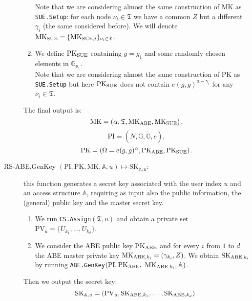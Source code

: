 \documentclass[a4paper,10pt]{article}
\newcommand{\G}{\mathbb{G}}
\newcommand{\GT}{\widetilde{\G}} \newcommand{\N}{\mathbb{N}}
\newcommand{\tree}{\mathfrak{T}}
\newcommand{\mapssingleoutput}[2]{$ \left( #1 \right) \mapsto #2 $}
\newcommand{\algorithm}[2]{\texttt{#1.#2}}
\newcommand{\algorithmdefsingleoutput}[4]{\item[#1.#2 \mapssingleoutput{#3}{#4}:] }
\newcommand{\PV}{\mathrm{PV}}
\begin{document}
\begin{description}
\begin{enumerate}
	Note that we are considering almost the same construction of $\mathrm{MK}$ as \algorithm{SUE}{Setup}: for each node $\nu_i\in\tree$ we have a common $Z$ but a different $\gamma_i$ (the same considered before). We will denote $\mathrm{MK}_{\textnormal{SUE}}=\{\mathrm{MK}_{\textnormal{SUE},i}\}_{\nu_i\in\tree}$.
	\item
	We define $\mathrm{PK}_{\textnormal{SUE}}$ containing $g=g_1$ and some randomly chosen elements in $\G_{p_1}$.\\
	Note that we are considering almost the same construction of $\mathrm{PK}$ as \algorithm{SUE}{Setup} but here   $\mathrm{PK}_{\textnormal{SUE}}$ does not contain $e(g,g)^{\alpha-\gamma_i}$ for any $\nu_i\in\tree$.



	\end{enumerate}
	The final output is:
	\[
		\mathit{\mathrm{MK}}=\left( \alpha, \tree,\mathrm{MK}_{\textnormal{ABE}},\mathrm{MK}_{\textnormal{SUE}}\right),
	\]
	\[
		\mathit{\mathrm{PI}}=\left( N, \G, \GT, e\right),
	\]
	\[
		\mathit{\mathrm{PK}}=\left( \Omega=e(g,g)^{\alpha},  \mathit{\mathrm{PK}}_{\textnormal{ABE}}, \mathit{\mathrm{PK}}_{\textnormal{SUE}}\right).
	\]
	
	\algorithmdefsingleoutput{RS-ABE}{GenKey}{\mathit{\mathrm{PI}},\mathit{\mathrm{PK}},\mathit{\mathrm{MK}},\mathbb{A},u}{\mathit{\mathrm{SK}}_{\mathbb{A},u}} this function generates a secret key associated with the user index $u$ and an access structure $\mathbb{A}$, requiring as input also the public information, the (general) public key and the master secret key.
	\begin{enumerate}
		\item
		We run \algorithm{CS}{Assign}$(\tree,u)$ and obtain a private set $\PV_u=\{U_{k_1},\ldots,U_{k_d}\}$.
		\item
 		 We consider the ABE  public key $\mathit{\mathrm{PK}}_{\textnormal{ABE}}$ and for every $i$ from $1$ to $d$ the ABE master private key $\mathit{\mathrm{MK}}_{\textnormal{ABE},k_i}=(\gamma_{k_i},Z)$. We  obtain $\mathit{\mathrm{SK}}_{\textnormal{ABE},k_i}$ by running \algorithm{ABE}{GenKey}$(\mathit{\mathrm{PI}},\mathit{\mathrm{PK}}_{\textnormal{ABE}},$ $\mathit{\mathrm{MK}}_{\textnormal{ABE},k_i},\mathbb{A})$.
	\end{enumerate}
	Then we output the secret key:
	\[
		\mathit{\mathrm{SK}}_{\mathbb{A},u}=\left( \mathit{\mathrm{PV}}_u, \mathit{\mathrm{SK}}_{\textnormal{ABE},k_1}, \ldots, \mathit{\mathrm{SK}}_{\textnormal{ABE},k_d} \right).
	\]
	

\end{description}
\end{document}
